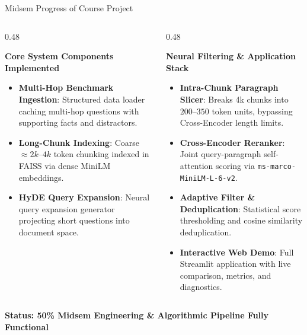 \documentclass[10pt,aspectratio=169]{beamer}
\begin{document}
\begin{frame}{Midsem Progress of Course Project}
    \begin{columns}[onlytextwidth,T]
        \begin{column}{0.48\textwidth}
            \begin{block}{\textbf{Core System Components Implemented}}
                \begin{itemize}
                    \item \textbf{Multi-Hop Benchmark Ingestion}: Structured data loader caching multi-hop questions with supporting facts and distractors.
                    \item \textbf{Long-Chunk Indexing}: Coarse $\approx 2k$--$4k$ token chunking indexed in FAISS via dense MiniLM embeddings.
                    \item \textbf{HyDE Query Expansion}: Neural query expansion generator projecting short questions into document space.
                \end{itemize}
            \end{block}
        \end{column}
        
        \begin{column}{0.48\textwidth}
            \begin{block}{\textbf{Neural Filtering \& Application Stack}}
                \begin{itemize}
                    \item \textbf{Intra-Chunk Paragraph Slicer}: Breaks 4k chunks into $200$--$350$ token units, bypassing Cross-Encoder length limits.
                    \item \textbf{Cross-Encoder Reranker}: Joint query-paragraph self-attention scoring via \texttt{ms-marco-MiniLM-L-6-v2}.
                    \item \textbf{Adaptive Filter \& Deduplication}: Statistical score thresholding and cosine similarity deduplication.
                    \item \textbf{Interactive Web Demo}: Full Streamlit application with live comparison, metrics, and diagnostics.
                \end{itemize}
            \end{block}
        \end{column}
    \end{columns}

    \vspace{0.25cm}
    \begin{center}
        \textcolor{accentgreen}{\textbf{Status: 50\% Midsem Engineering \& Algorithmic Pipeline Fully Functional}}
    \end{center}
\end{frame}
\end{document}
